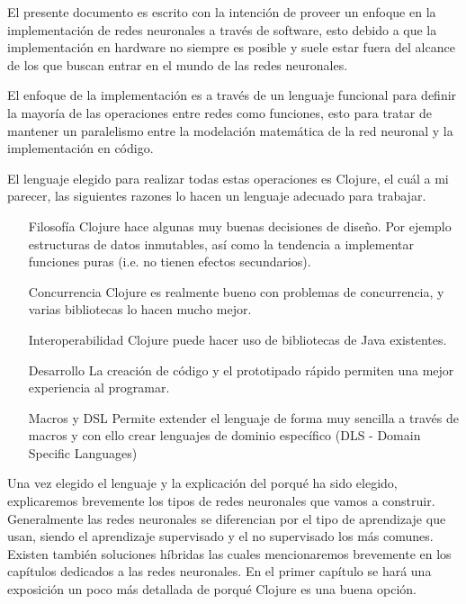 \begin{prefacio}

  El presente documento es escrito con la intención de proveer un
  enfoque en la implementación de redes neuronales a través de
  software, esto debido a que la implementación en hardware no siempre
  es posible y suele estar fuera del alcance de los que buscan entrar
  en el mundo de las redes neuronales.

  El enfoque de la implementación es a través de un lenguaje funcional
  para definir la mayoría de las operaciones entre redes como
  funciones, esto para tratar de mantener un paralelismo entre la
  modelación matemática de la red neuronal y la implementación en
  código.

  El lenguaje elegido para realizar todas estas operaciones es
  Clojure, el cuál a mi parecer, las siguientes razones lo hacen un
  lenguaje adecuado para trabajar.

  \begin{enumerate}
  \item [Filosofía] Clojure hace algunas muy buenas decisiones de
    diseño. Por ejemplo estructuras de datos inmutables, así como la
    tendencia a implementar funciones puras (i.e. no tienen efectos
    secundarios).
  \item [Concurrencia] Clojure es realmente bueno con problemas de
    concurrencia, y varias bibliotecas lo hacen mucho mejor.
  \item [Interoperabilidad] Clojure puede hacer uso de bibliotecas de
    Java existentes.
  \item [Desarrollo] La creación de código y el prototipado rápido
    permiten una mejor experiencia al programar.
  \item [Macros y DSL] Permite extender el lenguaje de forma muy
    sencilla a través de macros y con ello crear lenguajes de dominio
    específico (DLS - Domain Specific Languages)
  \end{enumerate}

  Una vez elegido el lenguaje y la explicación del porqué ha sido
  elegido, explicaremos brevemente los tipos de redes neuronales que
  vamos a construir. Generalmente las redes neuronales se diferencian
  por el tipo de aprendizaje que usan, siendo el aprendizaje
  supervisado y el no supervisado los más comunes. Existen también
  soluciones híbridas las cuales mencionaremos brevemente en los
  capítulos dedicados a las redes neuronales. En el primer capítulo se
  hará una exposición un poco más detallada de porqué Clojure es una
  buena opción.


\end{prefacio}
